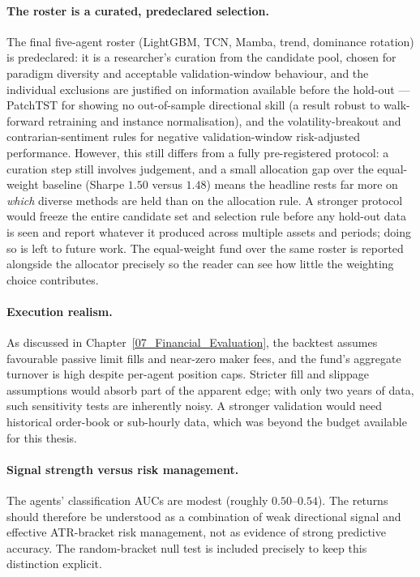 \paragraph{The roster is a curated, predeclared selection.}
The final five-agent roster (LightGBM, TCN, Mamba, trend, dominance rotation) is predeclared: it is a researcher's curation from the candidate pool, chosen for paradigm diversity and acceptable validation-window behaviour, and the individual exclusions are justified on information available before the hold-out --- PatchTST for showing no out-of-sample directional skill (a result robust to walk-forward retraining and instance normalisation), and the volatility-breakout and contrarian-sentiment rules for negative validation-window risk-adjusted performance. However, this still differs from a fully pre-registered protocol: a curation step still involves judgement, and a small allocation gap over the equal-weight baseline (Sharpe $1.50$ versus $1.48$) means the headline rests far more on \textit{which} diverse methods are held than on the allocation rule. A stronger protocol would freeze the entire candidate set and selection rule before any hold-out data is seen and report whatever it produced across multiple assets and periods; doing so is left to future work. The equal-weight fund over the same roster is reported alongside the allocator precisely so the reader can see how little the weighting choice contributes.

\paragraph{Execution realism.}
As discussed in Chapter~\ref{07_Financial_Evaluation}, the backtest assumes favourable passive limit fills and near-zero maker fees, and the fund's aggregate turnover is high despite per-agent position caps. Stricter fill and slippage assumptions would absorb part of the apparent edge; with only two years of data, such sensitivity tests are inherently noisy. A stronger validation would need historical order-book or sub-hourly data, which was beyond the budget available for this thesis.

\paragraph{Signal strength versus risk management.}
The agents' classification AUCs are modest (roughly $0.50$--$0.54$). The returns should therefore be understood as a combination of weak directional signal and effective ATR-bracket risk management, not as evidence of strong predictive accuracy. The random-bracket null test is included precisely to keep this distinction explicit.


